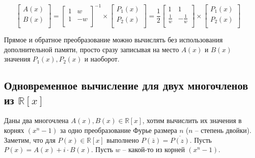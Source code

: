 \begin{@empty}
    \renewcommand*{\arraystretch}{1.7}

    \begin{equation}
        \begin{bmatrix}
            A(x) \\
            B(x) \\
        \end{bmatrix}
        =
        \begin{bmatrix}
            1 & w  \\
            1 & -w \\
        \end{bmatrix}^{-1}
        \times
        \begin{bmatrix}
            P_1(x) \\
            P_2(x) \\
        \end{bmatrix}
        =
        \frac{1}{2}
        \begin{bmatrix}
            1           & 1            \\
            \frac{1}{w} & -\frac{1}{w} \\
        \end{bmatrix}
        \times
        \begin{bmatrix}
            P_1(x) \\
            P_2(x) \\
        \end{bmatrix}
    \end{equation}
\end{@empty}

Прямое и обратное преобразование можно вычислять без использования дополнительной памяти,
просто сразу записывая на место $A(x)$ и $B(x)$ значения $P_1(x), P_2(x)$ и наоборот.


\subsection{Одновременное вычисление для двух многочленов из $\mathbb{R}[x]$}

Даны два многочлена $A(x), B(x) \in \mathbb{R}[x]$, хотим вычислить их значения в корнях $(x^n - 1)$ за одно преобразование Фурье размера $n$ ($n$ -- степень двойки).
Заметим, что для $P(x) \in \mathbb{R}[x]$ выполнено $P(\overline{z}) = \overline{P(z)}$.
Пусть $P(x) = A(x) + i \cdot B(x)$.
Пусть $w$ -- какой-то из корней $(x^n - 1)$.




